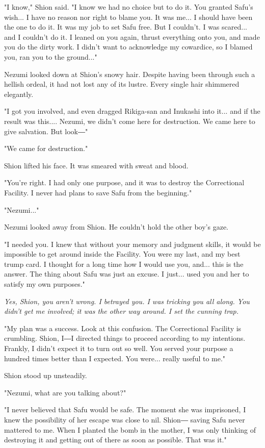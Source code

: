 "I know," Shion said. "I know we had no choice but to do it. You granted
Safu's wish... I have no reason nor right to blame you. It was me... I
should have been the one to do it. It was my job to set Safu free. But I
couldn't. I was scared... and I couldn't do it. I leaned on you again,
thrust everything onto you, and made you do the dirty work. I didn't
want to acknowledge my cowardice, so I blamed you, ran you to the
ground..."

Nezumi looked down at Shion's snowy hair. Despite having been through
such a hellish ordeal, it had not lost any of its lustre. Every single
hair shimmered elegantly.

"I got you involved, and even dragged Rikiga-san and Inukashi into it...
and if the result was this.... Nezumi, we didn't come here for
destruction. We came here to give salvation. But look―"

"We came for destruction."

Shion lifted his face. It was smeared with sweat and blood.

"You're right. I had only one purpose, and it was to destroy the
Correctional Facility. I never had plans to save Safu from the
beginning."

"Nezumi..."

Nezumi looked away from Shion. He couldn't hold the other boy's gaze.

"I needed you. I knew that without your memory and judgment skills, it
would be impossible to get around inside the Facility. You were my last,
and my best trump card. I thought for a long time how I would use you,
and... this is the answer. The thing about Safu was just an excuse. I
just... used you and her to satisfy my own purposes."

\emph{Yes, Shion, you aren't wrong. I betrayed you. I was tricking you all
along. You didn't get me involved; it was the other way around. I set
the cunning trap.}

"My plan was a success. Look at this confusion. The Correctional
Facility is crumbling. Shion, I―I directed things to proceed according
to my intentions. Frankly, I didn't expect it to turn out so well. You
served your purpose a hundred times better than I expected. You were...
really useful to me."

Shion stood up unsteadily.

"Nezumi, what are you talking about?"

"I never believed that Safu would be safe. The moment she was
imprisoned, I knew the possibility of her escape was close to nil.
Shion― saving Safu never mattered to me. When I planted the bomb in the
mother, I was only thinking of destroying it and getting out of there as
soon as possible. That was it."

